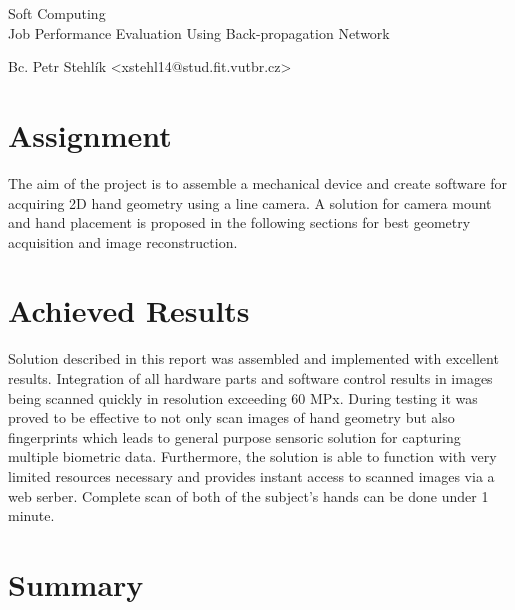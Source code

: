 \documentclass[11pt,a4paper]{article}
\begin{document}
\begin{center}
	\LARGE{Soft Computing}\\
	\Large{Job Performance Evaluation Using Back-propagation Network}
	\vspace{0.5cm}

    \begin{centering}
    \small{
        Bc. Petr Stehlík <xstehl14@stud.fit.vutbr.cz>
        }
    \end{centering}

	\vspace{0.2cm}

\end{center}

\section{Assignment}
The aim of the project is to assemble a mechanical device and create software for acquiring 2D hand geometry using a line camera.
A solution for camera mount and hand placement is proposed in the following sections for best geometry acquisition and image reconstruction.







\section{Achieved Results}
\label{sec:res}
Solution described in this report was assembled and implemented with excellent results. Integration of all hardware parts and software control results
in images being scanned quickly in resolution exceeding 60 MPx. During testing it was proved to be effective to not only scan images
of hand geometry but also fingerprints which leads to general purpose sensoric solution for capturing multiple biometric data. Furthermore,
the solution is able to function with very limited resources necessary and provides instant access to scanned images via a web serber. Complete scan of both of the subject's
hands can be done under 1 minute.

\section{Summary}
\label{sec:sum}
\end{document}
